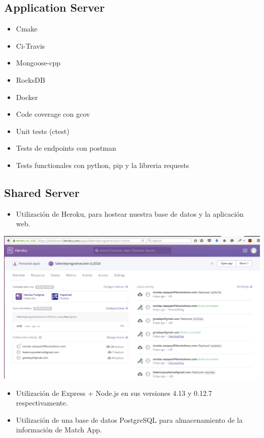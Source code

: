 \documentclass[letterpaper,10pt,english]{sphinxmanual}
\begin{document}
\subsection{Application Server}
\label{manuals:application-server}\begin{itemize}
\item {} 
Cmake

\item {} 
Ci-Travis

\item {} 
Mongoose-cpp

\item {} 
RocksDB

\item {} 
Docker

\item {} 
Code coverage con gcov

\item {} 
Unit tests (ctest)

\item {} 
Tests de endpoints con postman

\item {} 
Tests functionales con python, pip y la libreria requests

\end{itemize}


\subsection{Shared Server}
\label{manuals:shared-server}\begin{itemize}
\item {} 
Utilización de Heroku, para hostear nuestra base de datos y la aplicación web.

\end{itemize}

\includegraphics{heroku.png}
\begin{itemize}
\item {} 
Utilización de Express + Node.js en sus versiones 4.13 y 0.12.7 respectivamente.

\item {} 
Utilización de una base de datos PostgreSQL para almacenamiento de la información de Match App.

\end{itemize}
\end{document}
